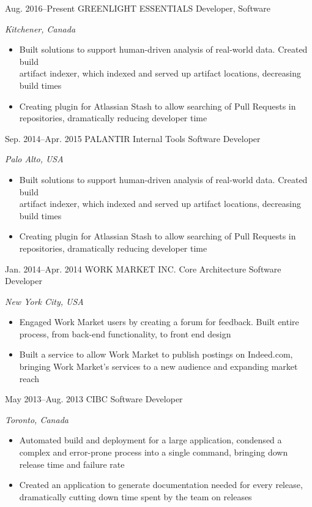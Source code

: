 \documentclass[]{friggeri-cv}
\begin{document}
\begin{sectionlist}
	\entry
	{Aug. 2016--Present}
	{GREENLIGHT ESSENTIALS}
	{Developer, Software}
	{\emph {Kitchener, Canada}\\
		\begin{itemize}
			\item Built solutions to support human-driven analysis of real-world data. Created build \\artifact indexer, which indexed and served up artifact locations, decreasing build times
			\item Creating plugin for Atlassian Stash to allow searching of Pull Requests in repositories, dramatically reducing developer time
		\end{itemize}
	}
	\entry
	{Sep. 2014--Apr. 2015}
	{PALANTIR}
	{Internal Tools Software Developer}
	{\emph {Palo Alto, USA} \\
		\begin{itemize}
			\item Built solutions to support human-driven analysis of real-world data. Created build \\artifact indexer, which indexed and served up artifact locations, decreasing build times
			\item Creating plugin for Atlassian Stash to allow searching of Pull Requests in repositories, dramatically reducing developer time
		\end{itemize}
	}
	
	\entry
	{Jan. 2014--Apr. 2014}
	{WORK MARKET INC.}
	{Core Architecture Software Developer }
	{\emph {New York City, USA}\\
		\begin{itemize}
			\item Engaged Work Market users by creating a forum for feedback. Built entire process, from back-end functionality, to front end design
			\item Built a service to allow Work Market to publish postings on Indeed.com, bringing Work Market's services to a new audience and expanding market reach
		\end{itemize}
	}
	
	\entry
	{May 2013--Aug. 2013}
	{CIBC}
	{Software Developer}
	{\emph 	{Toronto, Canada} \\
		\begin{itemize}
			\item Automated build and deployment for a large application, condensed a complex and error-prone process into a single command, bringing down release time and failure rate
			\item Created an application to generate documentation needed for every release,\\dramatically cutting down time spent by the team on releases
		\end{itemize}
	}
	
\end{sectionlist}
\end{document}
